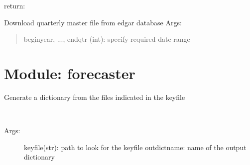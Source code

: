 \documentclass[letterpaper,10pt,english]{sphinxmanual}
\begin{document}
\begin{fulllineitems}
\begin{fulllineitems}
\begin{description}
\end{description}

return:

\end{fulllineitems}


\begin{fulllineitems}
\label{form10DB:form10DB.Form10Manager.updateQuarterMasterFile}
Download quarterly master file from edgar database
Args:
\begin{quote}

beginyear, ..., endqtr (int): specify required date range
\end{quote}

\end{fulllineitems}


\end{fulllineitems}



\chapter{Module: forecaster}
\label{forecaster:module-forecaster}\label{forecaster::doc}

\begin{fulllineitems}
\label{forecaster:forecaster.DictionaryGenerator}
Generate a dictionary from the files indicated in the keyfile

\begin{fulllineitems}
\label{forecaster:forecaster.DictionaryGenerator.GenerateDictionary}~\begin{description}
\item[{Args:}] \leavevmode
keyfile(str): path to look for the keyfile
outdictname: name of the output dictionary

\end{description}

\end{fulllineitems}


\end{fulllineitems}
\end{document}
